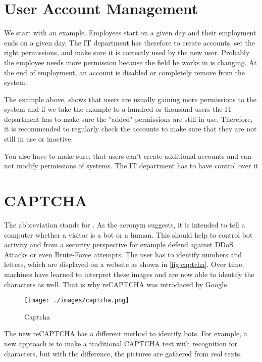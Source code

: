 \section{User Account Management}
We start with an example.
Employees start on a given day and their employment ends on a given day.
The IT department has therefore to create accounts, set the right permissions, and make sure it is correctly used by the new user.
Probably the employee needs more permission because the field he works in is changing.
At the end of employment, an account is disabled or completely remove from the system.

The example above, shows that users are usually gaining more permissions to the system and if we take the example to a hundred or thousand users the IT department has to make sure the "added" permissions are still in use.
Therefore, it is recommended to regularly check the accounts to make sure that they are not still in use or inactive.

You also have to make sure, that users can't create additional accounts and can not modify permissions of systems.
The IT department has to have control over it


\section{CAPTCHA}
The abbreviation stands for .
As the acronym suggests, it is intended to tell a computer whether a visitor is a bot or a human.
This should help to control bot activity and from a security perspective for example defend against DDoS Attacks or even Brute-Force attempts.
The user has to identify numbers and letters, which are displayed on a website as shown in \autoref{fig:captcha}.
Over time, machines have learned to interpret these images and are now able to identify the characters as well.
That is why reCAPTCHA was introduced by Google.

\begin{figure}[h]
    \centering
    \texttt{[image: ./images/captcha.png]}
    \caption{Captcha}
    \label{fig:captcha}
\end{figure}

The new reCAPTCHA has a different method to identify bots.
For example, a new approach is to make a traditional CAPTCHA test with recognition for characters, but with the difference, the pictures are gathered from real texts.

